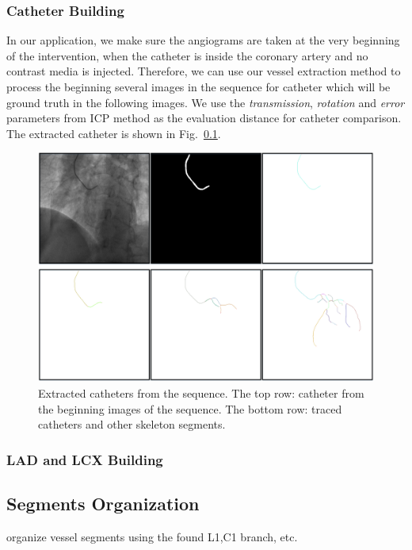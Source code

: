 \documentclass[journal]{IEEEtran}
\begin{document}
\subsubsection{\textbf{Catheter Building}}
In our application, we make sure the angiograms are taken at the very beginning of the intervention, when the catheter is inside the coronary artery and no contrast media is injected. Therefore, we can use our vessel extraction method to process the beginning several images in the sequence for catheter which will be ground truth in the following images. We use the \textit{transmission}, \textit{rotation} and \textit{error} parameters from ICP method as the evaluation distance for catheter comparison. The extracted catheter is shown in Fig.~\ref{}. 

\begin{figure}[!t]
\centering
\includegraphics[width=1.0\linewidth]{./images/catheter_building.png}
\caption{Extracted catheters from the sequence. The top row: catheter from the beginning images of the sequence. The bottom row: traced catheters and other skeleton segments.}
\label{fig:skel_organization}
\end{figure}


\subsubsection{\textbf{LAD and LCX Building}}


\subsection{Segments Organization}
organize vessel segments using the found L1,C1 branch, etc.
\end{document}
